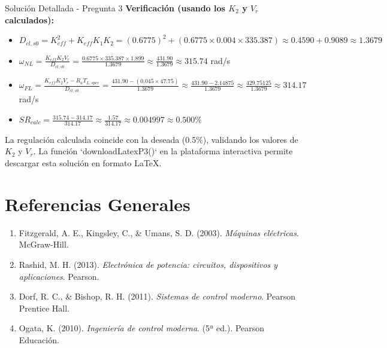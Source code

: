 \documentclass[12pt]{article}
\begin{document}
\begin{solutionbox}{Solución Detallada - Pregunta 3}
\textbf{Verificación (usando los $K_2$ y $V_r$ calculados):}
\begin{itemize}
    \item $D_{cl,s0} = K_{eff}^2 + K_{eff}K_1K_2 = (0.6775)^2 + (0.6775 \times 0.004 \times 335.387) \approx 0.4590 + 0.9089 \approx 1.3679$
    \item $\omega_{NL} = \frac{K_{eff}K_2 V_r}{D_{cl,s0}} = \frac{0.6775 \times 335.387 \times 1.899}{1.3679} \approx \frac{431.90}{1.3679} \approx 315.74$ rad/s
    \item $\omega_{FL} = \frac{K_{eff}K_2 V_r - R_a T_{L,spec}}{D_{cl,s0}} = \frac{431.90 - (0.045 \times 47.75)}{1.3679} \approx \frac{431.90 - 2.14875}{1.3679} \approx \frac{429.75125}{1.3679} \approx 314.17$ rad/s
    \item $SR_{calc} = \frac{315.74 - 314.17}{314.17} \approx \frac{1.57}{314.17} \approx 0.004997 \approx \mathbf{0.500\%}$
\end{itemize}
La regulación calculada coincide con la deseada (0.5\%), validando los valores de $K_2$ y $V_r$.
La función `downloadLatexP3()` en la plataforma interactiva permite descargar esta solución en formato LaTeX.

\end{solutionbox}

\newpage
\section*{Referencias Generales}
\begin{enumerate}[label=\arabic*.]
    \item Fitzgerald, A. E., Kingsley, C., \& Umans, S. D. (2003). \textit{Máquinas eléctricas}. McGraw-Hill.
    \item Rashid, M. H. (2013). \textit{Electrónica de potencia: circuitos, dispositivos y aplicaciones}. Pearson.
    \item Dorf, R. C., \& Bishop, R. H. (2011). \textit{Sistemas de control moderno}. Pearson Prentice Hall.
    \item Ogata, K. (2010). \textit{Ingeniería de control moderna}. (5ª ed.). Pearson Educación.
\end{enumerate}
\end{document}
